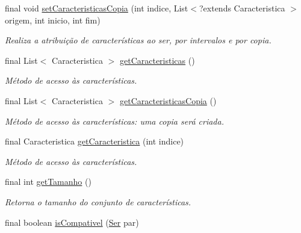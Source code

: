 \begin{DoxyCompactItemize}
final void \hyperlink{classic_1_1populacional_1_1_ser_3_01_g_01extends_01_number_01_6_comparable_3_01_g_01_4_01_4_ae03b3388fc7a96862ef28019d0aa289c}{set\-Caracteristicas\-Copia} (int indice, List$<$?extends Caracteristica $>$ origem, int inicio, int fim)
\begin{DoxyCompactList}\small\item\em Realiza a atribuição de características ao ser, por intervalos e por copia. \end{DoxyCompactList}\item 
final List$<$ Caracteristica $>$ \hyperlink{classic_1_1populacional_1_1_ser_3_01_g_01extends_01_number_01_6_comparable_3_01_g_01_4_01_4_a2396ecb15e7d2ac392b4c8c5708e22a5}{get\-Caracteristicas} ()
\begin{DoxyCompactList}\small\item\em Método de acesso às características. \end{DoxyCompactList}\item 
final List$<$ Caracteristica $>$ \hyperlink{classic_1_1populacional_1_1_ser_3_01_g_01extends_01_number_01_6_comparable_3_01_g_01_4_01_4_a601394f99633fca7aeaee5c5d653b264}{get\-Caracteristicas\-Copia} ()
\begin{DoxyCompactList}\small\item\em Método de acesso às características\-: uma copia será criada. \end{DoxyCompactList}\item 
final Caracteristica \hyperlink{classic_1_1populacional_1_1_ser_3_01_g_01extends_01_number_01_6_comparable_3_01_g_01_4_01_4_aa0212e5e11509ffa429727f17facc7dc}{get\-Caracteristica} (int indice)
\begin{DoxyCompactList}\small\item\em Método de acesso às características. \end{DoxyCompactList}\item 
final int \hyperlink{classic_1_1populacional_1_1_ser_3_01_g_01extends_01_number_01_6_comparable_3_01_g_01_4_01_4_a6651bf6d25d2c78439c449fdcd1b4fce}{get\-Tamanho} ()
\begin{DoxyCompactList}\small\item\em Retorna o tamanho do conjunto de características. \end{DoxyCompactList}\item 
final boolean \hyperlink{classic_1_1populacional_1_1_ser_3_01_g_01extends_01_number_01_6_comparable_3_01_g_01_4_01_4_a3e6ef446cadb169f4eb589a4b568ae96}{is\-Compativel} (\hyperlink{classic_1_1populacional_1_1_ser_3_01_g_01extends_01_number_01_6_comparable_3_01_g_01_4_01_4_ae72fa111fcce2c22172418ee5d1d8b29}{Ser} par)

\end{DoxyCompactItemize}
